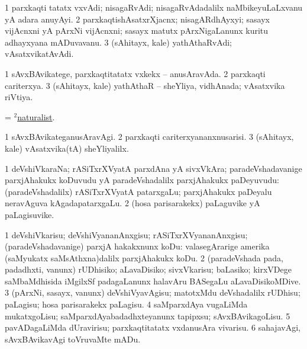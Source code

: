 \bentry
{}
\gl{\nA}
\bmng
\bnum
\num{1} parxkaqti tatatx vxvAdi; nisagaRvAdi; nisagaRvAdadalilx naMbikeyuLaLxvanu yA adara anuyAyi. 
\num{2} parxkaqtishAsatxrXjacnx; nisagARdhAyxyi; sasayx vijAcnxni yA pArxNi vijAcnxni; sasayx matutx pArxNigaLanunx kuritu adhayxyana mADuvavanu. 
\num{3} (sAhitayx, kale) yathAthaRvAdi; vAsatxvikatAvAdi. 
\enum
\emng
\eentry

\bentry
{}
\gl{\gu}
\bmng
\bnum
\num{1} sAvxBAvikatege, parxkaqtitatatx vxkekx -- anusAravAda. 
\num{2} parxkaqti cariterxya. 
\num{3} (sAhitayx, kale) yathAthaR -- sheYliya, vidhAnada; vAsatxvika riVtiya. 
\enum
\emng
\eentry

\bentry
{}
\gl{\gu}
\bmng
= \hyperlink{naturalist(2)}{$^2$naturalist}. 
\emng
\eentry

\bentry
{}
\gl{\kirxvi}
\bmng
\bnum
\num{1} sAvxBAvikateganusAravAgi. 
\num{2} parxkaqti cariterxyananxnusarisi. 
\num{3} (sAhitayx, kale) vAsatxvika(tA) sheYliyalilx. 
\enum
\emng
\eentry

\bentry
{}
\gl{\nA}
\bmng
\bnum
\num{1} deVshiVkaraNa; rASiTxrXVyatA parxdAna yA sivxVkAra; paradeVshadavanige parxjAhakukx koDuvudu yA paradeVshadalilx parxjAhakukx paDeyuvudu:  (paradeVshadalilx) rASiTxrXVyatA patarxgaLu; parxjAhakukx paDeyalu neravAguva kAgadapatarxgaLu. 
\num{2} (hosa parisarakekx) paLaguvike yA paLagisuvike. 
\enum
\emng
\eentry

\bentry
{}
\gl{\sakirx}
\bmng
\bnum
\num{1} deVshiVkarisu; deVshiVyananAnxgisu; rASiTxrXVyananAnxgisu; (paradeVshadavanige) parxjA hakakxnunx koDu:  valasegArarige amerika (saMyukatx saMsAthxna)dalilx parxjAhakukx koDu. 
\num{2} (paradeVshada pada, padadhxti, \mo vanunx) rUDhisiko; aLavaDisiko; sivxVkarisu; baLasiko;  kirxVDege saMbaMdhisida iMgilxSf padagaLanunx halavAru BASegaLu aLavaDisikoMDive. 
\num{3} (pArxNi, sasayx, \mo vanunx) deVshiVyavAgisu; matotxMdu deVshadalilx rUDhisu; paLagisu; hosa parisarakekx paLagisu. 
\num{4} saMparxdAya \mo vugaLiMda mukatxgoLisu; saMparxdAyabadadhxteyanunx tapipxsu; sAvxBAvikagoLisu. 
\num{5} pavADagaLiMda dUravirisu; parxkaqtitatatx vxdanusAra vivarisu. 
\num{6} sahajavAgi, sAvxBAvikavAgi toVruvaMte mADu. 
\enum
\emng

